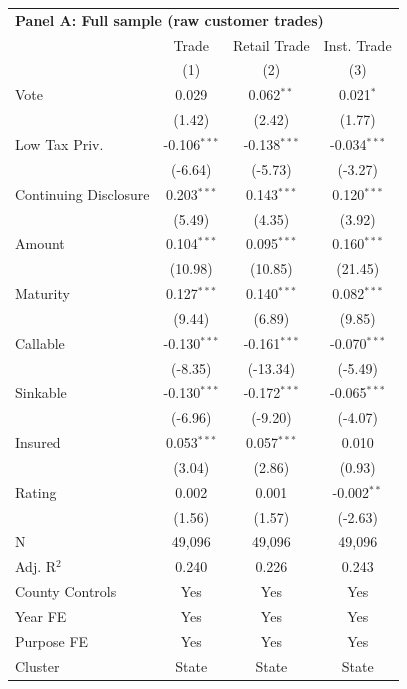 \begingroup
\centering
\begin{tabular*}{\textwidth}{@{\extracolsep{\fill}}lccc}
\multicolumn{5}{l}{\textbf{Panel A: Full sample (raw customer trades)}}\\

\addlinespace
   \toprule
                         & Trade          & Retail Trade   & Inst. Trade\\  
                         & (1)            & (2)            & (3)\\  
   \midrule 
   Vote                  & 0.029          & 0.062$^{**}$   & 0.021$^{*}$\\   
                         & (1.42)        & (2.42)        & (1.77)\\   
   Low Tax Priv.         & -0.106$^{***}$ & -0.138$^{***}$ & -0.034$^{***}$\\   
                         & (-6.64)       & (-5.73)       & (-3.27)\\   
   Continuing Disclosure & 0.203$^{***}$  & 0.143$^{***}$  & 0.120$^{***}$\\   
                         & (5.49)        & (4.35)        & (3.92)\\   
   Amount                & 0.104$^{***}$  & 0.095$^{***}$  & 0.160$^{***}$\\   
                         & (10.98)       & (10.85)       & (21.45)\\   
   Maturity              & 0.127$^{***}$  & 0.140$^{***}$  & 0.082$^{***}$\\   
                         & (9.44)        & (6.89)        & (9.85)\\   
   Callable              & -0.130$^{***}$ & -0.161$^{***}$ & -0.070$^{***}$\\   
                         & (-8.35)       & (-13.34)      & (-5.49)\\   
   Sinkable              & -0.130$^{***}$ & -0.172$^{***}$ & -0.065$^{***}$\\   
                         & (-6.96)       & (-9.20)       & (-4.07)\\   
   Insured               & 0.053$^{***}$  & 0.057$^{***}$  & 0.010\\   
                         & (3.04)        & (2.86)        & (0.93)\\   
   Rating                & 0.002          & 0.001          & -0.002$^{**}$\\   
                         & (1.56)        & (1.57)        & (-2.63)\\   
   \hline
   N          & 49,096         & 49,096         & 49,096\\  
   Adj. R$^2$        & 0.240          & 0.226          & 0.243\\  
   County Controls       & Yes            & Yes            & Yes\\  
   Year FE               & Yes            & Yes            & Yes\\  
   Purpose FE            & Yes            & Yes            & Yes\\  
   Cluster              & State & State & State\\  
   \bottomrule
\end{tabular*}
\par\endgroup
